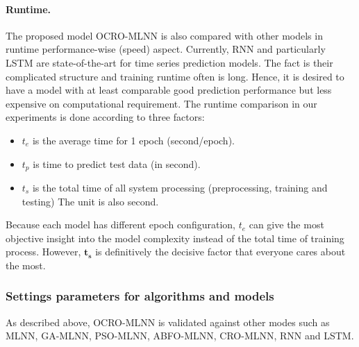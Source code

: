 \documentclass[11pt,twoside]{article}
\def \GN#1{\textcolor{tn_orange}{~#1}}			%
\begin{document}
\begin{multicols}{2}
\paragraph{\textbf{Runtime.}} The proposed model OCRO-MLNN is also compared with other models in runtime performance-wise (speed) aspect. Currently, RNN and particularly LSTM are state-of-the-art for time series prediction models. The fact is their complicated structure 
and training runtime often is long. Hence, it is desired to have a model with at least comparable good prediction performance but less expensive on computational requirement. %
The runtime comparison in our experiments is done according to three factors: 

\begin{itemize}
	\item $t_e$ is the average time for 1 epoch (second/epoch).
	\item $t_p$ is time to predict test data (in second). 
	\item $t_s$ is the total time of all system processing (preprocessing, training and testing) The unit is also second. 
\end {itemize}

Because each model has different epoch configuration, $t_e$ can give the most objective insight into the model complexity instead of the total time of training process. However, $\boldsymbol{t_s}$ is definitively the decisive factor that everyone cares about the most. 


\subsubsection{Settings parameters for algorithms and models}
\label{para_settings}

As described above, OCRO-MLNN is validated against other modes such as MLNN, GA-MLNN, PSO-MLNN, ABFO-MLNN, CRO-MLNN, RNN and LSTM. 


\end{multicols}
\end{document}
